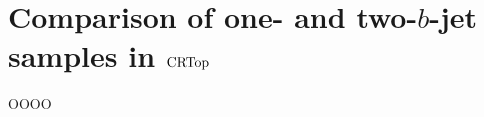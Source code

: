 \chapter[Comparison of one- and two-\texorpdfstring{$b$}{b}-jet samples in CRTop]{Comparison of one- and two-$b$-jet samples in $\mathrm{CRTop}$}
\label{app:appendix-7}

OOOO

